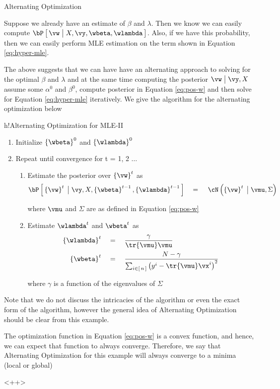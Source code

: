 \documentclass{article}
\begin{document}
\begin{ssection}{Alternating Optimization}

	Suppose we already have an estimate of $\beta$ and $\lambda$. Then we know we can easily compute $\prob{\vw \pipe X, \vy, \wbeta, \wlambda}$. Also, if we have this probability, then we can easily perform MLE estimation on the term shown in Equation \ref{eq:hyper-mle}. \br

	The above suggests that we can have have an alternating approach to solving for the optimal $\beta$ and $\lambda$ and at the same time computing the posterior $\vw \pipe \vy, X$  assume some $\alpha^0$ and $\beta^0$, compute posterior in Equation \ref{eq:pos-w} and then solve for Equation \ref{eq:hyper-mle} iteratively. We give the algorithm for the alternating optimization below \br

	\begin{algo}[0.8\textwidth]{h!}{Alternating Optimization for MLE-II}

		\begin{enumerate}
			\item Initialize $\set{\wbeta}^0$ and $\set{\wlambda}^0$
			\item Repeat until convergence for t = 1, 2 $\dots$

				\begin{enumerate}
					\item Estimate the posterior over $\set{\vw}^t$ as
						\begin{align*}
							\prob{\set{\vw}^t \pipe \vy, X, \set{\wbeta}^{t-1}, \set{\wlambda}^{t-1}}	\eq	\ND{\set{\vw}^t \pipe \vmu, \Sigma}
						\end{align*}

						where $\vmu$ and $\Sigma$ are as defined in Equation \ref{eq:pos-w} \br
					\item Estimate $\wlambda^t$ and $\wbeta^t$ as
						\begin{align*}
							\set{\wlambda}^t	&\eq	\frac{\gamma}{\tr{\vmu} \vmu} \\
							\set{\wbeta}^t	&\eq	\frac{N - \gamma}{\sum_{i \in \brac{n}} \para{y^i - \tr{\vmu} \vx^i}^2}
						\end{align*}

						where $\gamma$ is a function of the eigenvalues of $\Sigma$
				\end{enumerate}
		\end{enumerate}

	\end{algo}

	Note that we do not discuss the intricacies of the algorithm or even the exact form of the algorithm, however the general idea of Alternating Optimization should be clear from this example.

	\begin{remark}
		The optimization function in Equation \ref{eq:pos-w} is a convex function, and hence, we can expect that function to always converge. Therefore, we say that Alternating Optimization for this example will always converge to a minima (local or global)
	\end{remark}

\end{ssection}<++>
\end{document}
